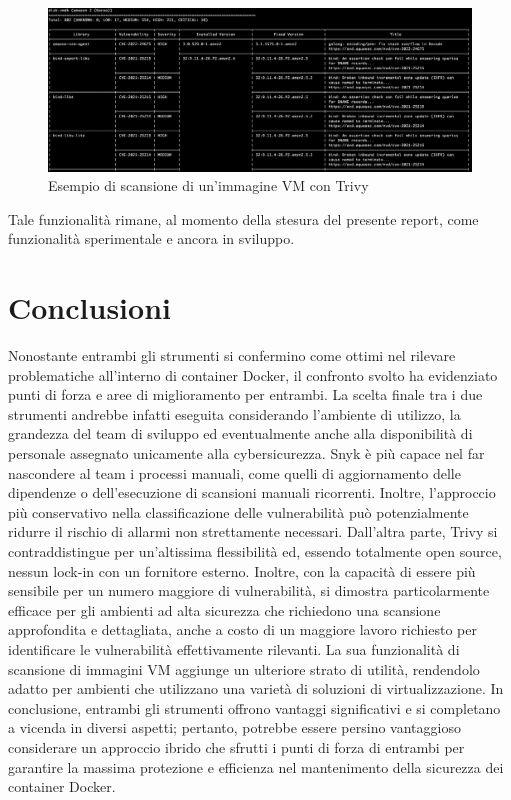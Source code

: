 \begin{figure}[H]
   \centering
   \includegraphics[width=1\textwidth]{immagini/capitolo2/trivy_vm.png}
   \caption{Esempio di scansione di un'immagine VM con Trivy}
   \label{fig:trivy_vm}
\end{figure}
Tale funzionalità rimane, al momento della stesura del presente report, come funzionalità sperimentale e ancora in sviluppo.

\section{Conclusioni}
Nonostante entrambi gli strumenti si confermino come ottimi nel rilevare problematiche all'interno di container Docker, il confronto svolto ha evidenziato punti di forza e aree di miglioramento per entrambi. La scelta finale tra i due strumenti andrebbe infatti eseguita considerando l'ambiente di utilizzo, la grandezza del team di sviluppo ed eventualmente anche alla disponibilità di personale assegnato unicamente alla cybersicurezza. Snyk è più capace nel far nascondere al team i processi manuali, come quelli di aggiornamento delle dipendenze o dell'esecuzione di scansioni manuali ricorrenti. Inoltre, l'approccio più conservativo nella classificazione delle vulnerabilità può potenzialmente ridurre il rischio di allarmi non strettamente necessari. Dall'altra parte, Trivy si contraddistingue per un'altissima flessibilità ed, essendo totalmente open source, nessun lock-in con un fornitore esterno. Inoltre, con la capacità di essere più sensibile per un numero maggiore di vulnerabilità, si dimostra particolarmente efficace per gli ambienti ad alta sicurezza che richiedono una scansione approfondita e dettagliata, anche a costo di un maggiore lavoro richiesto per identificare le vulnerabilità effettivamente rilevanti. La sua funzionalità di scansione di immagini VM aggiunge un ulteriore strato di utilità, rendendolo adatto per ambienti che utilizzano una varietà di soluzioni di virtualizzazione. In conclusione, entrambi gli strumenti offrono vantaggi significativi e si completano a vicenda in diversi aspetti; pertanto, potrebbe essere persino vantaggioso considerare un approccio ibrido che sfrutti i punti di forza di entrambi per garantire la massima protezione e efficienza nel mantenimento della sicurezza dei container Docker.